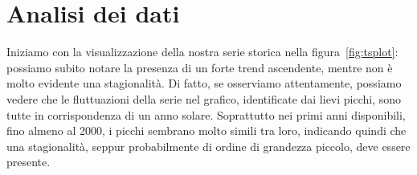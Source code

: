 \documentclass[11pt,a4paper,oneside]{article}
\begin{document}
\section{Analisi dei dati}
Iniziamo con la visualizzazione della nostra serie storica nella figura~\ref{fig:tsplot}: possiamo subito notare la presenza di un forte trend ascendente, mentre non è molto evidente una stagionalità.  Di fatto, se osserviamo attentamente, possiamo vedere che le fluttuazioni della serie nel grafico, identificate dai lievi picchi, sono tutte in corrispondenza di un anno solare. Soprattutto nei primi anni disponibili, fino almeno al 2000, i picchi sembrano molto simili tra loro, indicando quindi che una stagionalità, seppur probabilmente di ordine di grandezza piccolo, deve essere presente.
\begin{figure}[h]
\centering
{}
 \\
\caption{}
\label{fig:grafici}
\end{figure}
\end{document}
